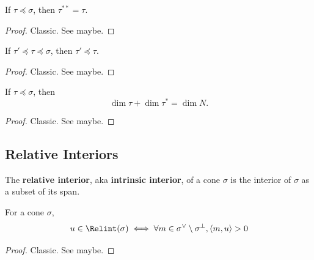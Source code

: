\begin{proposition}
  \label{1-2-10-double-dual-face-dual-face}

  If $\tau \preceq \sigma$, then $\tau^{**} = \tau$.
\end{proposition}
\begin{proof}

  Classic. See \cite{Oda_1988} maybe.
\end{proof}


\begin{proposition}
  \label{1-2-10-dual-face-antitone}

  If $\tau' \preceq \tau \preceq \sigma$, then $\tau' \preceq \tau$.
\end{proposition}
\begin{proof}
  \uses{}

  Classic. See \cite{Oda_1988} maybe.
\end{proof}


\begin{proposition}
  \label{1-2-10-double-dual-face-dual-face}

  If $\tau \preceq \sigma$, then
  $$\dim \tau + \dim \tau^* = \dim N.$$
\end{proposition}
\begin{proof}
  \uses{}

  Classic. See \cite{Oda_1988} maybe.
\end{proof}


\subsection{Relative Interiors}


\begin{definition}
  \label{1-2-rel-interior}
  \uses{}
  \leanok

  The {\bf relative interior}, aka {\bf intrinsic interior}, of a cone $\sigma$ is the interior of $\sigma$ as a subset of its span.
\end{definition}


\begin{lemma}
  \label{1-2-rel-interior-inner}

  For a cone $\sigma$,
  $$u \in \Relint(\sigma) \iff \forall m \in \sigma^\vee \setminus \sigma^\perp, \langle m, u\rangle > 0$$
\end{lemma}
\begin{proof}
  \uses{}

  Classic. See \cite{Oda_1988} maybe.
\end{proof}


